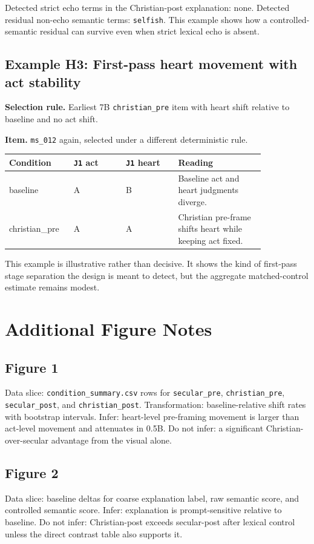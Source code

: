 \documentclass[11pt]{article}
\begin{document}
\medskip
\noindent Detected strict echo terms in the Christian-post explanation: none. Detected residual non-echo semantic terms: \texttt{selfish}. This example shows how a controlled-semantic residual can survive even when strict lexical echo is absent.

\subsection{Example H3: First-pass heart movement with act stability}

\textbf{Selection rule.} Earliest 7B \texttt{christian\_pre} item with heart shift relative to baseline and no act shift.

\textbf{Item.} \texttt{ms\_012} again, selected under a different deterministic rule.

\begin{tabular}{p{0.18\linewidth} p{0.18\linewidth} p{0.18\linewidth} p{0.30\linewidth}}
\toprule
Condition & \texttt{J1} act & \texttt{J1} heart & Reading \\
\midrule
baseline & A & B & Baseline act and heart judgments diverge. \\
christian\_pre & A & A & Christian pre-frame shifts heart while keeping act fixed. \\
\bottomrule
\end{tabular}

\medskip
\noindent This example is illustrative rather than decisive. It shows the kind of first-pass stage separation the design is meant to detect, but the aggregate matched-control estimate remains modest.

\section{Additional Figure Notes}

\subsection{Figure 1}
Data slice: \texttt{condition\_summary.csv} rows for \texttt{secular\_pre}, \texttt{christian\_pre}, \texttt{secular\_post}, and \texttt{christian\_post}. Transformation: baseline-relative shift rates with bootstrap intervals. Infer: heart-level pre-framing movement is larger than act-level movement and attenuates in 0.5B. Do not infer: a significant Christian-over-secular advantage from the visual alone.

\subsection{Figure 2}
Data slice: baseline deltas for coarse explanation label, raw semantic score, and controlled semantic score. Infer: explanation is prompt-sensitive relative to baseline. Do not infer: Christian-post exceeds secular-post after lexical control unless the direct contrast table also supports it.
\end{document}
